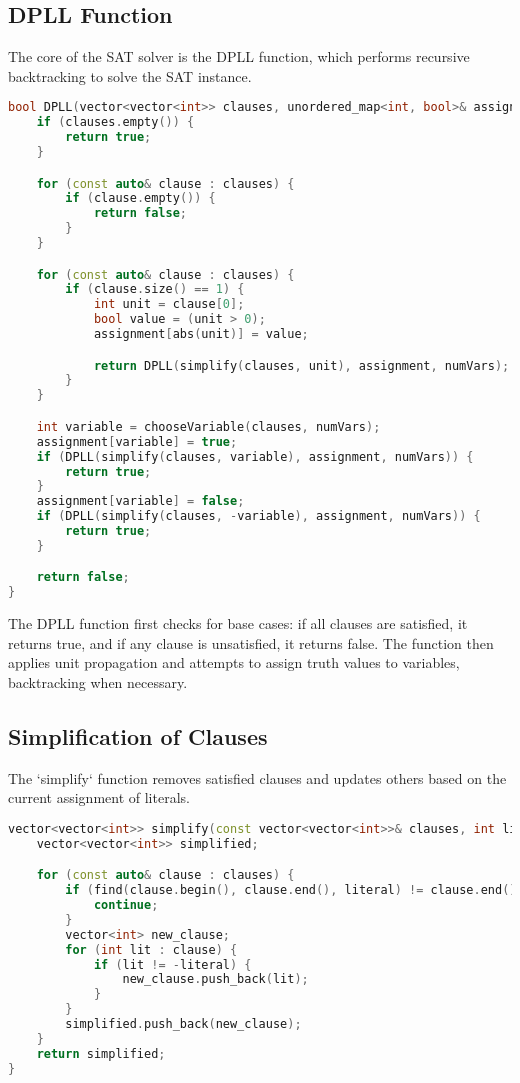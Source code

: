\documentclass[12pt]{article}
\begin{document}
\subsection{DPLL Function}
The core of the SAT solver is the DPLL function, which performs recursive backtracking to solve the SAT instance.
\begin{lstlisting}[language=C++]
bool DPLL(vector<vector<int>> clauses, unordered_map<int, bool>& assignment, int numVars) {
    if (clauses.empty()) {
        return true;
    }

    for (const auto& clause : clauses) {
        if (clause.empty()) {
            return false;
        }
    }

    for (const auto& clause : clauses) {
        if (clause.size() == 1) {
            int unit = clause[0];
            bool value = (unit > 0);
            assignment[abs(unit)] = value;

            return DPLL(simplify(clauses, unit), assignment, numVars);
        }
    }

    int variable = chooseVariable(clauses, numVars);
    assignment[variable] = true;
    if (DPLL(simplify(clauses, variable), assignment, numVars)) {
        return true;
    }
    assignment[variable] = false;
    if (DPLL(simplify(clauses, -variable), assignment, numVars)) {
        return true;
    }

    return false;
}
\end{lstlisting}

The DPLL function first checks for base cases: if all clauses are satisfied, it returns true, and if any clause is unsatisfied, it returns false. The function then applies unit propagation and attempts to assign truth values to variables, backtracking when necessary.

\subsection{Simplification of Clauses}
The `simplify` function removes satisfied clauses and updates others based on the current assignment of literals.
\begin{lstlisting}[language=C++]
vector<vector<int>> simplify(const vector<vector<int>>& clauses, int literal) {
    vector<vector<int>> simplified;

    for (const auto& clause : clauses) {
        if (find(clause.begin(), clause.end(), literal) != clause.end()) {
            continue;
        }
        vector<int> new_clause;
        for (int lit : clause) {
            if (lit != -literal) {
                new_clause.push_back(lit);
            }
        }
        simplified.push_back(new_clause);
    }
    return simplified;
}
\end{lstlisting}
\end{document}
